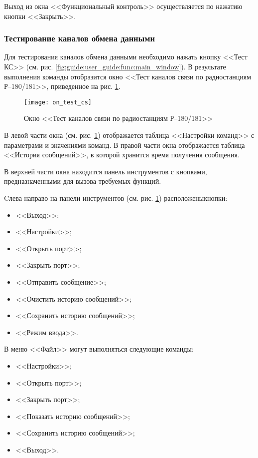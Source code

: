 Выход из окна <<Функциональный контроль>> осуществляется по нажатию кнопки <<Закрыть>>.


\subsubsection{Тестирование каналов обмена данными}
\label{sub:guide:user_guide:radio}

Для тестирования каналов обмена данными необходимо нажать кнопку <<Тест КС>> (см. рис.
\ref{fig:guide:user_guide:func:main_window}).
В результате выполнения команды отобразится окно <<Тест каналов связи по радиостанциям Р–180/181>>, приведенное на рис.
\ref{fig:guide:user_guide:radio:on_test_cs}.
\begin{figure}[htb]
	\centering
	\texttt{[image: on\_test\_cs]}
	\caption{Окно <<Тест каналов связи по радиостанциям Р–180/181>>}
	\label{fig:guide:user_guide:radio:on_test_cs}
\end{figure}
В левой части окна (см. рис. \ref{fig:guide:user_guide:radio:on_test_cs}) отображается таблица <<Настройки команд>> с параметрами и значениями команд.
В правой части окна отображается таблица <<История сообщений>>, в которой хранится время получения сообщения.

В верхней части окна находится панель инструментов с кнопками, предназначенными для вызова требуемых функций.

Cлева направо на панели инструментов (см. рис. \ref{fig:guide:user_guide:radio:on_test_cs}) расположены\break кнопки:
\begin{itemize}
	\item <<Выход>>;
	\item <<Настройки>>;
	\item <<Открыть порт>>;
	\item <<Закрыть порт>>;
	\item <<Отправить сообщение>>;
	\item <<Очистить историю сообщений>>;
	\item <<Сохранить историю сообщений>>;
	\item <<Режим ввода>>.
\end{itemize}

В меню <<Файл>> могут выполняться следующие команды:
\begin{itemize}
	\item <<Настройки>>;
	\item <<Открыть порт>>;
	\item <<Закрыть порт>>;
	\item <<Показать историю сообщений>>;
	\item <<Сохранить историю сообщений>>;
	\item <<Выход>>.
\end{itemize}


